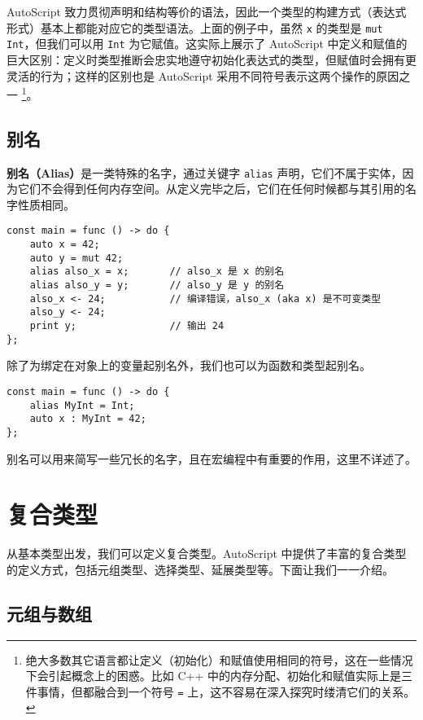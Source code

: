 AutoScript 致力贯彻声明和结构等价的语法，因此一个类型的构建方式（表达式形式）基本上都能对应它的类型语法。上面的例子中，虽然 \lstinline!x! 的类型是 \lstinline!mut Int!，但我们可以用 \lstinline!Int! 为它赋值。这实际上展示了 AutoScript 中定义和赋值的巨大区别：定义时类型推断会忠实地遵守初始化表达式的类型，但赋值时会拥有更灵活的行为；这样的区别也是 AutoScript 采用不同符号表示这两个操作的原因之一 \footnote{绝大多数其它语言都让定义（初始化）和赋值使用相同的符号，这在一些情况下会引起概念上的困惑。比如 C++ 中的内存分配、初始化和赋值实际上是三件事情，但都融合到一个符号 \lstinline!=! 上，这不容易在深入探究时缕清它们的关系。}。

\subsection{别名}

\textbf{别名（Alias）}是一类特殊的名字，通过关键字 \lstinline!alias! 声明，它们不属于实体，因为它们不会得到任何内存空间。从定义完毕之后，它们在任何时候都与其引用的名字性质相同。

\begin{lstlisting}
const main = func () -> do {
    auto x = 42;
    auto y = mut 42;
    alias also_x = x;       // also_x 是 x 的别名
    alias also_y = y;       // also_y 是 y 的别名
    also_x <- 24;           // 编译错误，also_x (aka x) 是不可变类型
    also_y <- 24;
    print y;                // 输出 24
};
\end{lstlisting}

除了为绑定在对象上的变量起别名外，我们也可以为函数和类型起别名。

\begin{lstlisting}
const main = func () -> do {
    alias MyInt = Int;
    auto x : MyInt = 42;
};
\end{lstlisting}

别名可以用来简写一些冗长的名字，且在宏编程中有重要的作用，这里不详述了。


\section{复合类型}

从基本类型出发，我们可以定义复合类型。AutoScript 中提供了丰富的复合类型的定义方式，包括元组类型、选择类型、延展类型等。下面让我们一一介绍。

\subsection{元组与数组}

